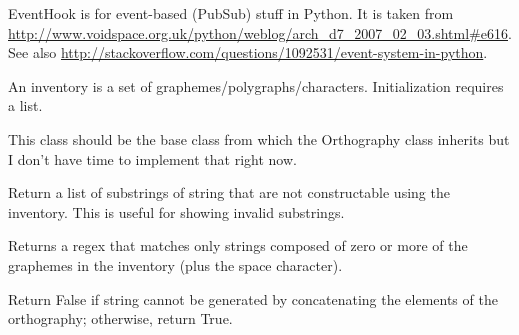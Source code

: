 \documentclass[letterpaper,10pt,english]{sphinxmanual}
\begin{document}

\begin{fulllineitems}
\label{api:old.lib.utils.EventHook}
EventHook is for event-based (PubSub) stuff in Python.  It is taken from
\href{http://www.voidspace.org.uk/python/weblog/arch\_d7\_2007\_02\_03.shtml\#e616}{http://www.voidspace.org.uk/python/weblog/arch\_d7\_2007\_02\_03.shtml\#e616}.
See also \href{http://stackoverflow.com/questions/1092531/event-system-in-python}{http://stackoverflow.com/questions/1092531/event-system-in-python}.

\end{fulllineitems}


\begin{fulllineitems}
\label{api:old.lib.utils.Inventory}
An inventory is a set of graphemes/polygraphs/characters.  Initialization
requires a list.

This class should be the base class from which the Orthography class
inherits but I don't have time to implement that right now.

\begin{fulllineitems}
\label{api:old.lib.utils.Inventory.getNonMatchingSubstrings}
Return a list of substrings of string that are not constructable
using the inventory.  This is useful for showing invalid substrings.

\end{fulllineitems}


\begin{fulllineitems}
\label{api:old.lib.utils.Inventory.getRegexValidator}
Returns a regex that matches only strings composed of zero or more
of the graphemes in the inventory (plus the space character).

\end{fulllineitems}


\begin{fulllineitems}
\label{api:old.lib.utils.Inventory.stringIsValid}
Return False if string cannot be generated by concatenating the
elements of the orthography; otherwise, return True.

\end{fulllineitems}


\end{fulllineitems}
\end{document}
